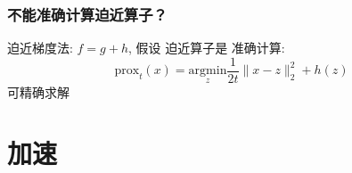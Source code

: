 \documentclass[handout]{beamer}
\begin{document}






\begin{frame}

\frametitle{不能准确计算迫近算子？}

迫近梯度法: $f=g+h$, 假设 迫近算子是 准确计算:
\begin{equation}
\text{prox}_{t}(x)=\underset{z}{\text{argmin}} \frac{1}{2 t}\|x-z\|_{2}^{2}+h(z)
\end{equation}
可精确求解 


\end{frame}
\section{加速}
\end{document}

